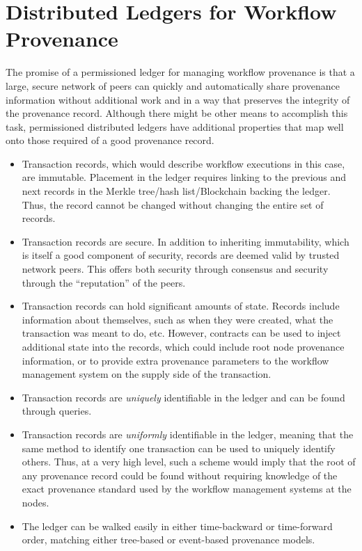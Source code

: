 \section{Distributed Ledgers for Workflow Provenance}
\label{case}
The promise of a permissioned ledger for managing workflow provenance is that a
large, secure network of peers can quickly and automatically share provenance
information without additional work and in a way that preserves the integrity
of the provenance record. Although there might be other means to accomplish this
task, permissioned distributed ledgers have additional properties that map well
onto those required of a good provenance record.
\begin{itemize}
    \item Transaction records, which would describe workflow executions in this
    case, are immutable. Placement in the ledger requires linking to the
    previous and next records in the Merkle tree/hash list/Blockchain backing
    the ledger. Thus, the record cannot be changed without changing the entire
    set of records.
    \item Transaction records are secure. In addition to inheriting
    immutability, which is itself a good component of security, records are
    deemed valid by trusted network peers. This offers both security through
    consensus and security through the ``reputation'' of the peers.
    \item Transaction records can hold significant amounts of state. Records
    include information about themselves, such as when they were created, what
    the transaction was meant to do, etc. However, contracts can be used to
    inject additional state into the records, which could include root node
    provenance information, or to provide extra provenance parameters to the
    workflow management system on the supply side of the transaction.
    \item Transaction records are \textit{uniquely} identifiable in the ledger
    and can be found through queries.
    \item Transaction records are \textit{uniformly} identifiable in the ledger,
    meaning that the same method to identify one transaction can be used to
    uniquely identify others. Thus, at a very high level, such a scheme would
    imply that the root of any provenance record could be found without
    requiring knowledge of the exact provenance standard used by the workflow
    management systems at the nodes.
    \item The ledger can be walked easily in either time-backward or
    time-forward order, matching either tree-based or event-based provenance
    models.
\end{itemize}

